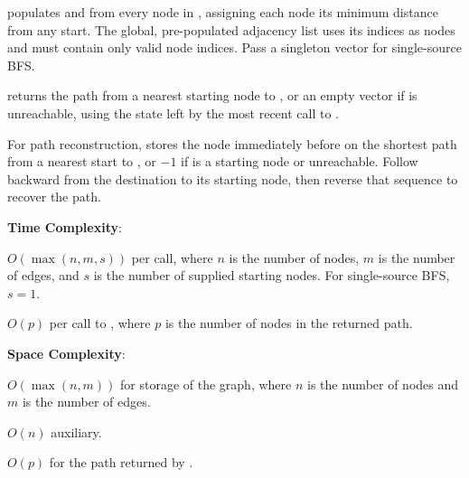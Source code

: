 \begin{compactitem}
  \item {} populates  and  from every node in , assigning each node its minimum distance from any start. The global, pre-populated adjacency list  uses its indices as nodes and must contain only valid node indices. Pass a singleton vector for single-source BFS.
  \item {} returns the path from a nearest starting node to , or an empty vector if  is unreachable, using the state left by the most recent call to .
\end{compactitem}

For path reconstruction,  stores the node immediately before  on the shortest path from a nearest start to , or $-1$ if  is a starting node or unreachable. Follow  backward from the destination to its starting node, then reverse that sequence to recover the path.

\textbf{Time Complexity}:
\begin{compactitem}
  \item $O(\max\left(n, m, s\right))$ per call, where $n$ is the number of nodes, $m$ is the number of edges, and $s$ is the number of supplied starting nodes. For single-source BFS, $s = 1$.
  \item $O(p)$ per call to , where $p$ is the number of nodes in the returned path.
\end{compactitem}

\textbf{Space Complexity}:
\begin{compactitem}
  \item $O(\max\left(n, m\right))$ for storage of the graph, where $n$ is the number of nodes and $m$ is the number of edges.
  \item $O(n)$ auxiliary.
  \item $O(p)$ for the path returned by .
\end{compactitem}

